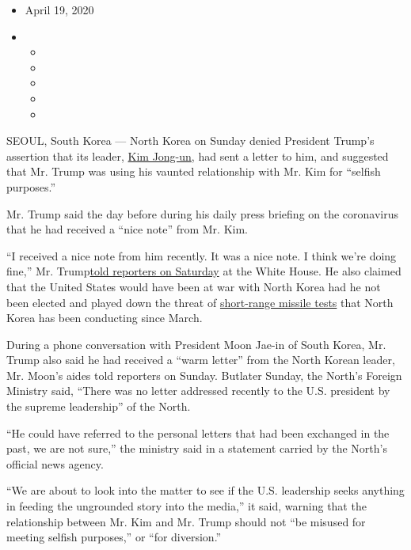 \begin{itemize}
\item
  April 19, 2020
\item
  \begin{itemize}
  \item
  \item
  \item
  \item
  \item
  \end{itemize}
\end{itemize}

SEOUL, South Korea --- North Korea on Sunday denied President Trump's
assertion that its leader,
\href{https://www.nytimes.com/2020/04/26/world/asia/kim-jong-un-absence-north-korea.html}{Kim
Jong-un}, had sent a letter to him, and suggested that Mr. Trump was
using his vaunted relationship with Mr. Kim for ``selfish purposes.''

Mr. Trump said the day before during his daily press briefing on the
coronavirus that he had received a ``nice note'' from Mr. Kim.

``I received a nice note from him recently. It was a nice note. I think
we're doing fine,'' Mr.
Trump\href{https://www.c-span.org/video/?c4869685/user-clip-mad-man}{told
reporters on Saturday} at the White House. He also claimed that the
United States would have been at war with North Korea had he not been
elected and played down the threat of
\href{https://www.nytimes.com/2020/04/14/world/asia/north-korea-fires-missiles.html}{short-range
missile tests} that North Korea has been conducting since March.

During a phone conversation with President Moon Jae-in of South Korea,
Mr. Trump also ​said he had received a ``warm letter'' from the North
Korean leader, Mr. Moon's aides told reporters on Sunday. But ​later
Sunday, ​the North's Foreign Ministry ​said, ``There was no letter
addressed recently to the U.S. president by the supreme leadership'' of
the North.

``He could have referred to the personal letters that had been exchanged
in the past, we are not sure,'' the ministry said in a statement carried
by the North's official news agency.

``We are about to look into the matter to see if the U.S. leadership
seeks anything in feeding the ungrounded story into the media,'' it
said, warning that the​ relationship between Mr. Kim and Mr. Trump
should not ``be misused for meeting selfish purposes,'' or ``for
diversion.''

